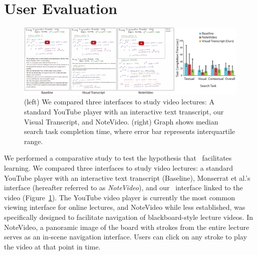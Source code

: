 \section{User Evaluation}
%
\begin{figure}[h]
    \centering
          \includegraphics[width=\textwidth]{figures/evaluation-interfaces.pdf}
         \caption{(left) We compared three interfaces to study video lectures: A standard YouTube player with an interactive text transcript, our Visual Transcript, and NoteVideo. (right) Graph shows median search task completion time, where error bar represents interquartile range.}
    \label{Fig:interfaces}
\end{figure} 
%
We performed a comparative study to test the hypothesis that \systemname\ facilitates learning. We compared three interfaces to study video lectures: a standard YouTube player with an interactive text transcript (Baseline), Monserrat et al.'s interface \cite{monserrat2013notevideo} (hereafter referred to as \emph{NoteVideo}), and our \systemname\ interface linked to the video (Figure~\ref{Fig:interfaces}). The YouTube video player is currently the most common viewing interface for online lectures, and NoteVideo while less established, was specifically designed to facilitate navigation of blackboard-style lecture videos. In NoteVideo, a panoramic image of the board with strokes from the entire lecture serves as an in-scene navigation interface. Users can click on any stroke to play the video at that point in time.
%

